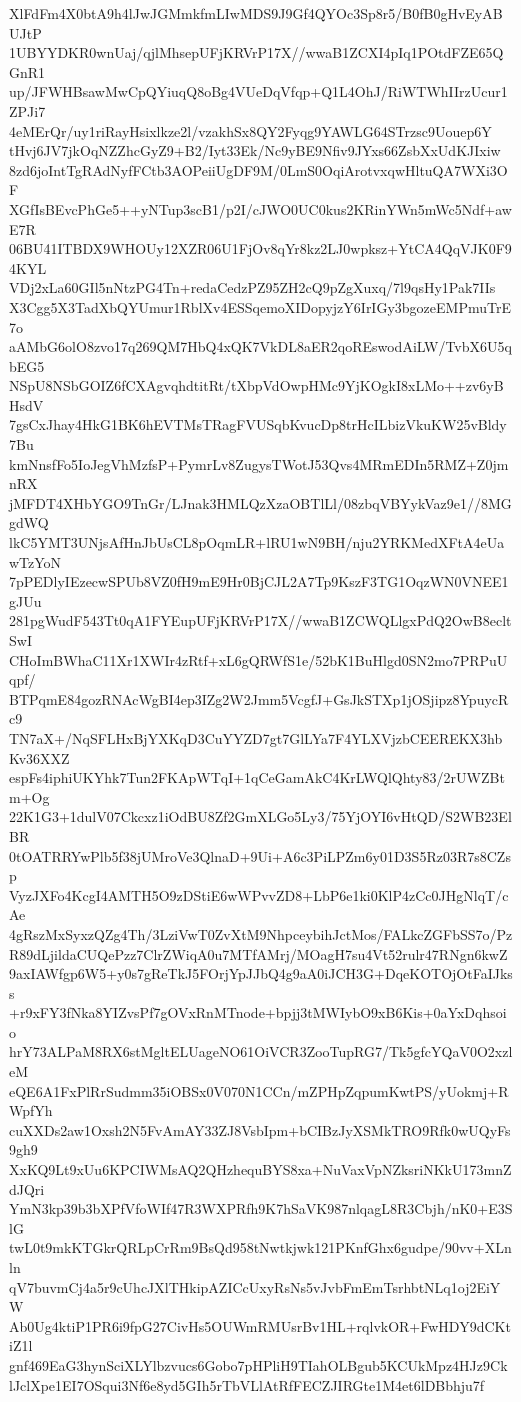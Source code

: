 XlFdFm4X0btA9h4lJwJGMmkfmLIwMDS9J9Gf4QYOc3Sp8r5/B0fB0gHvEyABUJtP
1UBYYDKR0wnUaj/qjlMhsepUFjKRVrP17X//wwaB1ZCXI4pIq1POtdFZE65QGnR1
up/JFWHBsawMwCpQYiuqQ8oBg4VUeDqVfqp+Q1L4OhJ/RiWTWhIIrzUcur1ZPJi7
4eMErQr/uy1riRayHsixlkze2l/vzakhSx8QY2Fyqg9YAWLG64STrzsc9Uouep6Y
tHvj6JV7jkOqNZZhcGyZ9+B2/Iyt33Ek/Nc9yBE9Nfiv9JYxs66ZsbXxUdKJIxiw
8zd6joIntTgRAdNyfFCtb3AOPeiiUgDF9M/0LmS0OqiArotvxqwHltuQA7WXi3OF
XGfIsBEvcPhGe5++yNTup3scB1/p2I/cJWO0UC0kus2KRinYWn5mWc5Ndf+awE7R
06BU41ITBDX9WHOUy12XZR06U1FjOv8qYr8kz2LJ0wpksz+YtCA4QqVJK0F94KYL
VDj2xLa60GIl5nNtzPG4Tn+redaCedzPZ95ZH2cQ9pZgXuxq/7l9qsHy1Pak7IIs
X3Cgg5X3TadXbQYUmur1RblXv4ESSqemoXIDopyjzY6IrIGy3bgozeEMPmuTrE7o
aAMbG6olO8zvo17q269QM7HbQ4xQK7VkDL8aER2qoREswodAiLW/TvbX6U5qbEG5
NSpU8NSbGOIZ6fCXAgvqhdtitRt/tXbpVdOwpHMc9YjKOgkI8xLMo++zv6yBHsdV
7gsCxJhay4HkG1BK6hEVTMsTRagFVUSqbKvucDp8trHcILbizVkuKW25vBldy7Bu
kmNnsfFo5IoJegVhMzfsP+PymrLv8ZugysTWotJ53Qvs4MRmEDIn5RMZ+Z0jmnRX
jMFDT4XHbYGO9TnGr/LJnak3HMLQzXzaOBTlLl/08zbqVBYykVaz9e1//8MGgdWQ
lkC5YMT3UNjsAfHnJbUsCL8pOqmLR+lRU1wN9BH/nju2YRKMedXFtA4eUawTzYoN
7pPEDlyIEzecwSPUb8VZ0fH9mE9Hr0BjCJL2A7Tp9KszF3TG1OqzWN0VNEE1gJUu
281pgWudF543Tt0qA1FYEupUFjKRVrP17X//wwaB1ZCWQLlgxPdQ2OwB8ecltSwI
CHoImBWhaC11Xr1XWIr4zRtf+xL6gQRWfS1e/52bK1BuHlgd0SN2mo7PRPuUqpf/
BTPqmE84gozRNAcWgBI4ep3IZg2W2Jmm5VcgfJ+GsJkSTXp1jOSjipz8YpuycRc9
TN7aX+/NqSFLHxBjYXKqD3CuYYZD7gt7GlLYa7F4YLXVjzbCEEREKX3hbKv36XXZ
espFs4iphiUKYhk7Tun2FKApWTqI+1qCeGamAkC4KrLWQlQhty83/2rUWZBtm+Og
22K1G3+1dulV07Ckcxz1iOdBU8Zf2GmXLGo5Ly3/75YjOYI6vHtQD/S2WB23ElBR
0tOATRRYwPlb5f38jUMroVe3QlnaD+9Ui+A6c3PiLPZm6y01D3S5Rz03R7s8CZsp
VyzJXFo4KcgI4AMTH5O9zDStiE6wWPvvZD8+LbP6e1ki0KlP4zCc0JHgNlqT/cAe
4gRszMxSyxzQZg4Th/3LziVwT0ZvXtM9NhpceybihJctMos/FALkcZGFbSS7o/Pz
R89dLjildaCUQePzz7ClrZWiqA0u7MTfAMrj/MOagH7su4Vt52rulr47RNgn6kwZ
9axIAWfgp6W5+y0s7gReTkJ5FOrjYpJJbQ4g9aA0iJCH3G+DqeKOTOjOtFaIJkss
+r9xFY3fNka8YIZvsPf7gOVxRnMTnode+bpjj3tMWIybO9xB6Kis+0aYxDqhsoio
hrY73ALPaM8RX6stMgltELUageNO61OiVCR3ZooTupRG7/Tk5gfcYQaV0O2xzleM
eQE6A1FxPlRrSudmm35iOBSx0V070N1CCn/mZPHpZqpumKwtPS/yUokmj+RWpfYh
cuXXDs2aw1Oxsh2N5FvAmAY33ZJ8VsbIpm+bCIBzJyXSMkTRO9Rfk0wUQyFs9gh9
XxKQ9Lt9xUu6KPCIWMsAQ2QHzhequBYS8xa+NuVaxVpNZksriNKkU173mnZdJQri
YmN3kp39b3bXPfVfoWIf47R3WXPRfh9K7hSaVK987nlqagL8R3Cbjh/nK0+E3SlG
twL0t9mkKTGkrQRLpCrRm9BsQd958tNwtkjwk121PKnfGhx6gudpe/90vv+XLnln
qV7buvmCj4a5r9cUhcJXlTHkipAZICcUxyRsNs5vJvbFmEmTsrhbtNLq1oj2EiYW
Ab0Ug4ktiP1PR6i9fpG27CivHs5OUWmRMUsrBv1HL+rqlvkOR+FwHDY9dCKtiZ1l
gnf469EaG3hynSciXLYlbzvucs6Gobo7pHPliH9TIahOLBgub5KCUkMpz4HJz9Ck
lJclXpe1EI7OSqui3Nf6e8yd5GIh5rTbVLlAtRfFECZJIRGte1M4et6lDBbhju7f
